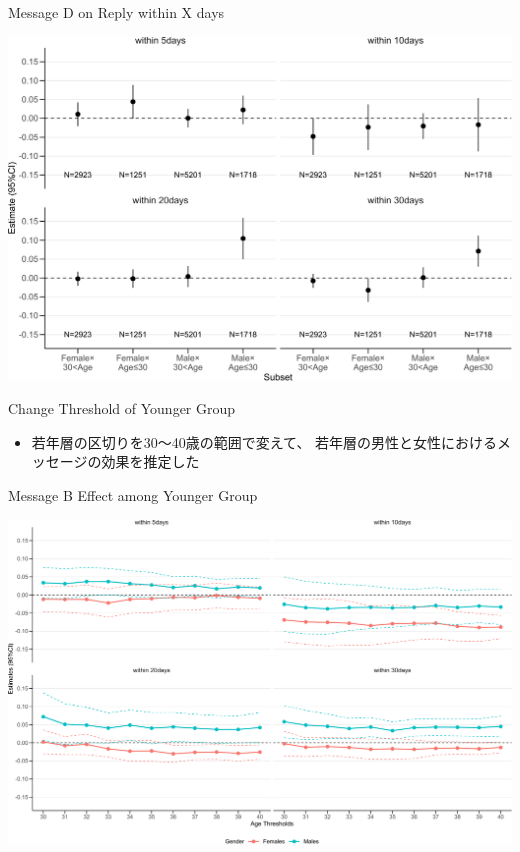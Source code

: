 \documentclass[
      aspectratio=169,
        12pt,
    ]{beamer}
\providecommand{\tightlist}{%
  \setlength{\itemsep}{0pt}\setlength{\parskip}{0pt}}
\begin{document}
\begin{frame}{Message D on Reply within X days}
\protect\hypertarget{message-d-on-reply-within-x-days}{}
\begin{center}\includegraphics[width=0.75\linewidth]{report_files/figure-beamer/plotD-hetero-gender-age-secondary-1} \end{center}
\end{frame}

\begin{frame}{Change Threshold of Younger Group}
\protect\hypertarget{change-threshold-of-younger-group-1}{}
\begin{itemize}
\tightlist
\item
  若年層の区切りを30～40歳の範囲で変えて、
  若年層の男性と女性におけるメッセージの効果を推定した
\end{itemize}
\end{frame}

\begin{frame}{Message B Effect among Younger Group}
\protect\hypertarget{message-b-effect-among-younger-group-1}{}
\begin{center}\includegraphics[width=0.75\linewidth]{report_files/figure-beamer/plotB-change-age-threshold-secondary-1} \end{center}
\end{frame}
\end{document}
